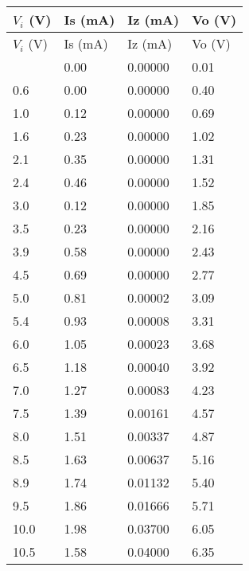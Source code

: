 \documentclass{scrartcl}
\begin{document}
\begin{longtable}{|l|l|l|l|}
        \hline
        $V_i$ (V) & Is (mA) & Iz (mA) & Vo (V) \\ \hline
        \endfirsthead
        \hline
        $V_i$ (V) & Is (mA) & Iz (mA) & Vo (V) \\ \hline
        \endhead
        \hline
        \endfoot
        \hline
        \endlastfoot
        0.0     & 0.00       & 0.00000       & 0.01    \\ \hline
        0.6    & 0.00       & 0.00000       & 0.40     \\ \hline
        1.0     & 0.12    & 0.00000      & 0.69    \\ \hline
        1.6    & 0.23    & 0.00000       & 1.02    \\ \hline
        2.1    & 0.35    & 0.00000      & 1.31    \\ \hline
        2.4    & 0.46    & 0.00000       & 1.52    \\ \hline
        3.0     & 0.12    & 0.00000       & 1.85    \\ \hline
        3.5    & 0.23    & 0.00000       & 2.16    \\ \hline
        3.9    & 0.58    & 0.00000      & 2.43    \\ \hline
        4.5    & 0.69    & 0.00000       & 2.77    \\ \hline
        5.0      & 0.81    & 0.00002       & 3.09    \\ \hline
        5.4    & 0.93    & 0.00008       & 3.31    \\ \hline
        6.0      & 1.05    & 0.00023       & 3.68    \\ \hline
        6.5    & 1.18    & 0.00040       & 3.92    \\ \hline
        7.0      & 1.27    & 0.00083       & 4.23    \\ \hline
        7.5    & 1.39    & 0.00161       & 4.57    \\ \hline
        8.0      & 1.51    & 0.00337       & 4.87    \\ \hline
        8.5    & 1.63    & 0.00637       & 5.16    \\ \hline
        8.9    & 1.74    & 0.01132       & 5.40    \\ \hline
        9.5    & 1.86    & 0.01666       & 5.71    \\ \hline
        10.0     & 1.98    & 0.03700       & 6.05    \\ \hline
        10.5   & 1.58    & 0.04000       & 6.35    \\ \hline

\end{longtable}
\end{document}
